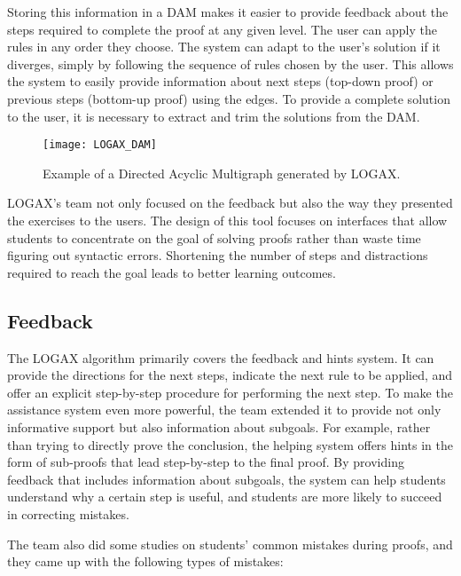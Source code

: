 Storing this information in a \gls{DAM} makes it easier to provide feedback about the steps required to complete the proof at any given level. The user can apply the rules in any order they choose. The system can adapt to the user's solution if it diverges, simply by following the sequence of rules chosen by the user. This allows the system to easily provide information about next steps (top-down proof) or previous steps (bottom-up proof) using the edges. To provide a complete solution to the user, it is necessary to extract and trim the solutions from the \gls{DAM}.

\begin{figure}[htbp]
    \centering
    \texttt{[image: LOGAX\_DAM]}
    \caption{Example of a Directed Acyclic Multigraph generated by LOGAX.}
    \label{img:dam}
\end{figure}

LOGAX's team not only focused on the feedback but also the way they presented the exercises to the users. The design of this tool focuses on interfaces that allow students to concentrate on the goal of solving proofs rather than waste time figuring out syntactic errors. Shortening the number of steps and distractions required to reach the goal leads to better learning outcomes.

\subsection{Feedback}

The LOGAX algorithm primarily covers the feedback and hints system. It can provide the directions for the next steps, indicate the next rule to be applied, and offer an explicit step-by-step procedure for performing the next step. To make the assistance system even more powerful, the team extended it to provide not only informative support but also information about subgoals. For example, rather than trying to directly prove the conclusion, the helping system offers hints in the form of sub-proofs that lead step-by-step to the final proof. By providing feedback that includes information about subgoals, the system can help students understand why a certain step is useful, and students are more likely to succeed in correcting mistakes.

The team also did some studies on students' common mistakes during proofs, and they came up with the following types of mistakes:

